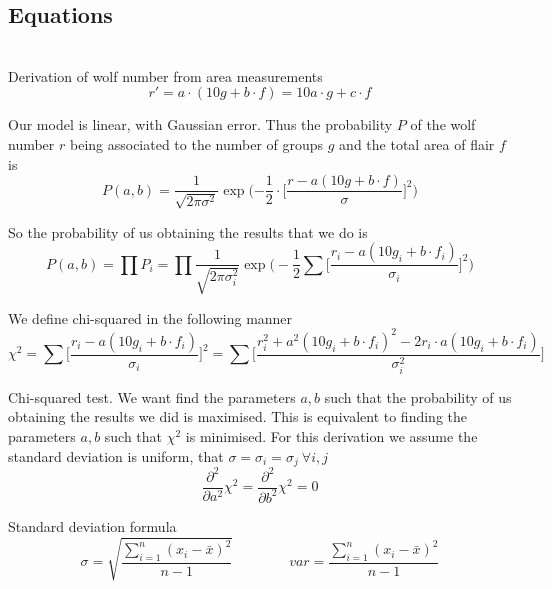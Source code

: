 \documentclass[12pt]{article}
\begin{document}
\subsection{Equations}\\

Derivation of wolf number from area measurements
\begin{equation}\label{equation:derivde wolf}
    r' = a\cdot(10 g + b\cdot f) = 10 a\cdot g + c\cdot f
\end{equation}

Our model is linear, with Gaussian error. Thus the probability $P$ of the wolf number $r$ being associated to the number of groups $g$ and the total area of flair $f$ is
\begin{equation}\label{equation:wolf probability}
    P(a,b) = \frac{1}{\sqrt{2\pi\sigma^2}} \exp\bigg( {-\frac{1}{2}\cdot \Big[ \frac{r - a(10g+b\cdot f)}{\sigma} \Big]^2} \bigg)
\end{equation}

So the probability of us obtaining the results that we do is
\begin{equation}\label{equation:wolf total probability}
    P(a,b) = \prod P_i = \prod \frac{1}{\sqrt{2\pi\sigma_i^2}} 
    \exp \bigg( -\frac{1}{2} \sum \Big[ \frac{r_i - a(10g_i+b\cdot f_i)}{\sigma_i} \Big]^2 \bigg)
\end{equation}

We define chi-squared in the following manner
\begin{equation}\label{equation:chi-squared}
    \chi^2 = \sum \bigg[ \frac{r_i - a (10g_i + b\cdot f_i)}{\sigma_i} \bigg]^2 = 
    \sum \bigg[ \frac{r_i^2 + a^2(10g_i + b\cdot f_i)^2 - 2r_i\cdot a(10g_i + b\cdot f_i)}{\sigma_i^2} \bigg]
\end{equation}

Chi-squared test. We want find the parameters $a,b$ such that the probability of us obtaining the results we did is maximised. This is equivalent to finding the parameters $a,b$ such that $\chi^2$ is minimised. For this derivation we assume the standard deviation is uniform, that $\sigma = \sigma_i = \sigma_j\ \forall i,j$
\begin{equation}\label{equation:chi squared condition for best fit params}
    \frac{\partial^2}{\partial a^2}\chi^2 = \frac{\partial^2}{\partial b^2}\chi^2 = 0
\end{equation}

Standard deviation formula
\begin{equation}\label{equation:standard deviation}
    \sigma = \sqrt{\frac{\sum_{i=1}^{n} (x_i - \bar{x})^2}{n-1}}  \quad \quad \quad \quad 
    var = \frac{\sum_{i=1}^{n} (x_i - \bar{x})^2}{n-1}
\end{equation}
\end{document}
